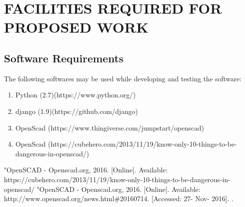 \documentclass[12pt,includeheadfoot,a4paper]{report}
\begin{document}
 \chapter{FACILITIES REQUIRED FOR PROPOSED WORK}

\section{Software Requirements}
The following softwares may be used while developing and testing the software:
\begin{enumerate} 
	\item  Python (2.7)(https://www.python.org/)
        \item  django (1.9)(https://github.com/django)
	\item  OpenScad (https://www.thingiverse.com/jumpstart/openscad)
        \item  OpenScad (https://cubehero.com/2013/11/19/know-only-10-things-to-be-dangerous-in-openscad/)
          \end{enumerate}

 
\begin{thebibliography}{22}
\bibitem{} "OpenSCAD -  Openscad.org, 2016. [Online]. Available: https://cubehero.com/2013/11/19/know-only-10-things-to-be-dangerous-in-openscad/
\bibitem{} "OpenSCAD -  Openscad.org, 2016. [Online]. Available: http://www.openscad.org/news.html\#20160714. [Accessed: 27- Nov- 2016].
.

\end{thebibliography}
\end{document}
